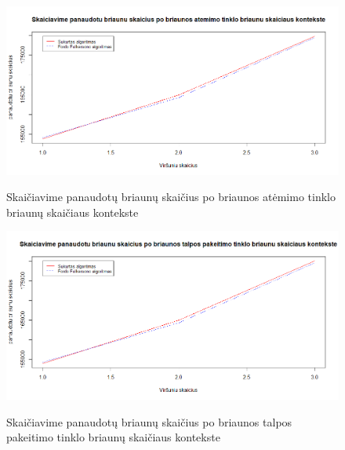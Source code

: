 \begin{figure}[H]
	\caption{Skaičiavime panaudotų briaunų skaičius po briaunos atėmimo tinklo briaunų skaičiaus kontekste}
	\centering
	\includegraphics[width=\textwidth]{img/ere.png}
	\label{plot:ere}
\end{figure}
\begin{figure}[H]
	\caption{Skaičiavime panaudotų briaunų skaičius po briaunos talpos pakeitimo tinklo briaunų skaičiaus kontekste}
	\centering
	\includegraphics[width=\textwidth]{img/eue.png}
	\label{plot:eue}
\end{figure}

